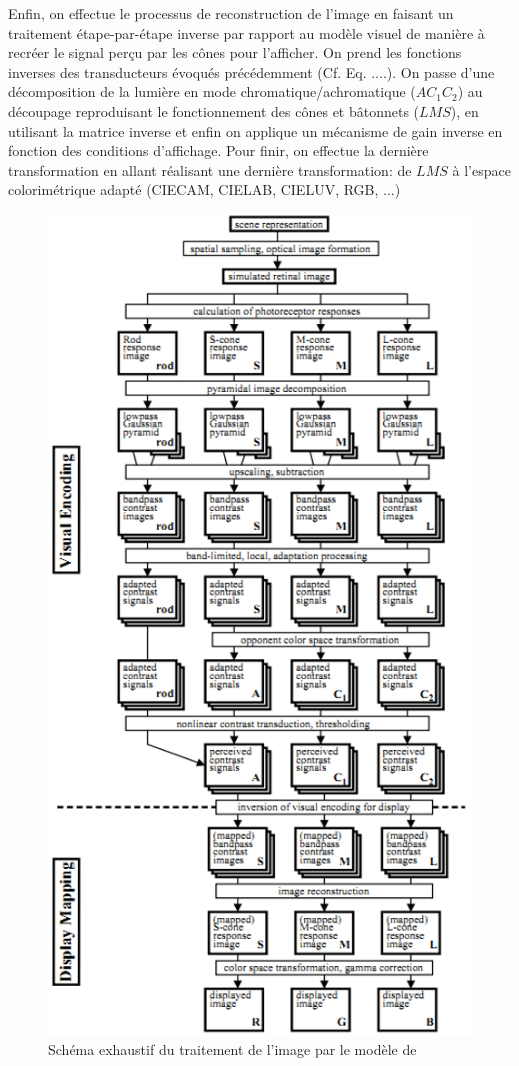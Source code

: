 	\par Enfin, on effectue le processus de reconstruction de l'image en faisant un traitement étape-par-étape inverse par rapport au modèle visuel de manière à recréer le signal perçu par les cônes pour l'afficher. On prend les fonctions inverses des transducteurs évoqués précédemment (Cf. Eq. ....). On passe d'une décomposition de la lumière en mode chromatique/achromatique ($AC_1C_2$) au découpage reproduisant le fonctionnement des cônes et bâtonnets ($LMS$), en utilisant la matrice inverse et enfin on applique un mécanisme de gain inverse en fonction des conditions d'affichage. Pour finir, on effectue la dernière transformation en allant réalisant une dernière transformation: de $LMS$ à l'espace colorimétrique adapté (CIECAM, CIELAB, CIELUV, RGB, ...)
	
	\begin{figure}
		\centering
		\includegraphics[scale=1.25]{Figures/PattanaikFullModel}
		\caption{Schéma exhaustif du traitement de l'image par le modèle de \citep{pattanaik_multiscale_1998}}
		\label{fig:full_model_pattanaik}
	\end{figure}
	
